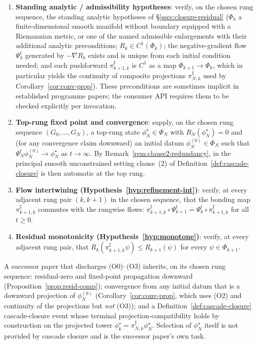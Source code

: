 \documentclass[11pt]{article}
\theoremstyle{definition}
\begin{document}
\begin{enumerate}[leftmargin=2.4em, label=\textup{(O\arabic*)}, start=0, nosep, topsep=4pt]
\item \textbf{Standing analytic / admissibility hypotheses}: verify,
  on the chosen rung sequence, the standing analytic hypotheses of
  \S\ref{ssec:closure-residual} ($\Phi_k$ a finite-dimensional smooth
  manifold without boundary equipped with a Riemannian metric, or one
  of the named admissible enlargements with their additional analytic
  preconditions; $R_k \in C^1(\Phi_k)$; the negative-gradient flow
  $\Psi_k^t$ generated by $-\nabla R_k$ exists and is unique from each
  initial condition needed; and each pushforward
  $\pi^{\sharp}_{k+1, k}$ is $C^1$ as a map $\Phi_{k+1} \to \Phi_k$,
  which in particular yields the continuity of composite projections
  $\pi^{\sharp}_{N, k}$ used by Corollary~\ref{cor:conv-prop}). These
  preconditions are sometimes implicit in established programme
  papers; the consumer API requires them to be checked explicitly per
  invocation.
\item \textbf{Top-rung fixed point and convergence}: supply, on the
  chosen rung sequence $(G_0, \ldots, G_N)$, a top-rung state
  $\phi^\star_N \in \Phi_N$ with $R_N(\phi^\star_N) = 0$ and (for any
  convergence claim downward) an initial datum
  $\phi_N^{(0)} \in \Phi_N$ such that
  $\Psi_N^t \phi_N^{(0)} \to \phi^\star_N$ as $t \to \infty$. By
  Remark~\ref{rem:clause2-redundancy}, in the principal smooth
  unconstrained setting clause~(2) of
  Definition~\ref{def:cascade-closure} is then automatic at the top rung.
\item \textbf{Flow intertwining (Hypothesis~\ref{hyp:refinement-int})}:
  verify, at every adjacent rung pair $(k, k{+}1)$ in the chosen
  sequence, that the bonding map $\pi^{\sharp}_{k+1, k}$ commutes
  with the rungwise flows: $\pi^{\sharp}_{k+1, k} \circ \Psi_{k+1}^t
  = \Psi_k^t \circ \pi^{\sharp}_{k+1, k}$ for all $t \geq 0$.
\item \textbf{Residual monotonicity (Hypothesis~\ref{hyp:monotone})}:
  verify, at every adjacent rung pair, that
  $R_k(\pi^{\sharp}_{k+1, k} \psi) \leq R_{k+1}(\psi)$ for every
  $\psi \in \Phi_{k+1}$.
\end{enumerate}

\noindent A successor paper that discharges (O0)--(O3) inherits, on
its chosen rung sequence: residual-zero and fixed-point propagation
downward (Proposition~\ref{prop:resid-comp}); convergence from any
initial datum that is a downward projection of $\phi_N^{(0)}$
(Corollary~\ref{cor:conv-prop}, which uses (O2) and continuity of the
projections but \emph{not} (O3)); and a Definition~\ref{def:cascade-closure}
cascade-closure event whose terminal projection-compatibility holds by
construction on the projected tower
$\phi^\star_k = \pi^{\sharp}_{N, k} \phi^\star_N$. Selection of
$\phi^\star_N$ itself is not provided by cascade closure and is the
successor paper's own task.
\end{document}
